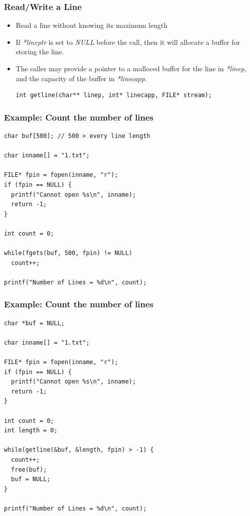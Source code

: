 \documentclass{../c-lecture}
\begin{document}
\begin{frame}[fragile]
  \frametitle{Read/Write a Line}
  \begin{itemize}
    \item Read a line without knowing its maximum length
    \item If \textit{\color{LimeGreen}*lineptr} is set to \textit{\color{RubineRed} NULL} before the call, then it will allocate a buffer for storing the line.
    \item
      The caller may provide a pointer to a malloced buffer for the line in
      \textit{\color{YellowOrange}*linep}, and the capacity of the buffer in
      \textit{\color{LimeGreen}*linecapp}.

    \begin{verbatim}
int getline(char** linep, int* linecapp, FILE* stream);
    \end{verbatim}
  \end{itemize}
\end{frame}

\begin{frame}[fragile]
  \frametitle{Example: Count the number of lines}
  \scriptsize
  \begin{verbatim}
char buf[500]; // 500 > every line length

char inname[] = "1.txt";

FILE* fpin = fopen(inname, "r");
if (fpin == NULL) {
  printf("Cannot open %s\n", inname);
  return -1;
}

int count = 0;

while(fgets(buf, 500, fpin) != NULL)
  count++;

printf("Number of Lines = %d\n", count);
  \end{verbatim}
\end{frame}

\begin{frame}[fragile]
  \frametitle{Example: Count the number of lines}
  \scriptsize
  \begin{verbatim}
char *buf = NULL;

char inname[] = "1.txt";

FILE* fpin = fopen(inname, "r");
if (fpin == NULL) {
  printf("Cannot open %s\n", inname);
  return -1;
}

int count = 0;
int length = 0;

while(getline(&buf, &length, fpin) > -1) {
  count++;
  free(buf);
  buf = NULL;
}

printf("Number of Lines = %d\n", count);
  \end{verbatim}
\end{frame}
\end{document}
